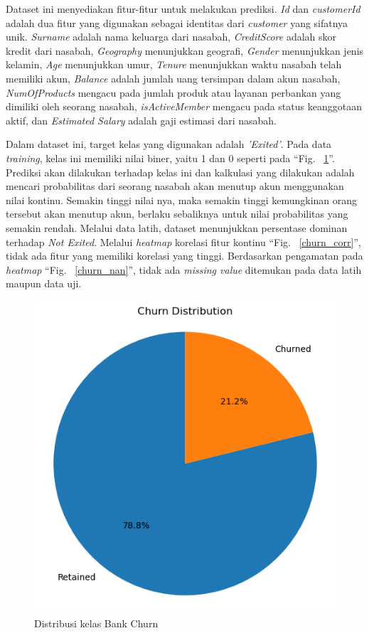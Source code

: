 \documentclass[conference]{IEEEtran}
\begin{document}
Dataset ini menyediakan fitur-fitur untuk melakukan prediksi. \textit{Id} dan \textit{customerId} adalah dua fitur yang digunakan sebagai identitas dari \textit{customer} yang sifatnya unik. \textit{Surname} adalah nama keluarga dari nasabah, 
\textit{CreditScore} adalah skor kredit dari nasabah, \textit{Geography} menunjukkan geografi, \textit{Gender} menunjukkan jenis kelamin, \textit{Age} menunjukkan umur, \textit{Tenure} menunjukkan waktu nasabah telah memiliki akun, \textit{Balance} adalah jumlah 
uang tersimpan dalam akun nasabah, \textit{NumOfProducts} mengacu pada jumlah produk atau layanan perbankan yang dimiliki oleh seorang nasabah, \textit{isActiveMember} mengacu pada status keanggotaan aktif, dan \textit{Estimated Salary} 
adalah gaji estimasi dari nasabah.

Dalam dataset ini, target kelas yang digunakan adalah \textit{'Exited'}. Pada data \textit{training}, kelas ini memiliki nilai biner, yaitu 1 dan 0 seperti pada ``Fig. ~\ref{churn_distribution}''. Prediksi akan dilakukan terhadap kelas ini dan kalkulasi yang dilakukan adalah 
mencari probabilitas dari seorang nasabah akan menutup akun menggunakan nilai kontinu. Semakin tinggi nilai nya, maka semakin tinggi kemungkinan orang tersebut akan menutup akun, berlaku sebaliknya untuk nilai 
probabilitas yang semakin rendah. Melalui data latih, dataset menunjukkan persentase dominan terhadap \textit{Not Exited}. Melalui \textit{heatmap} korelasi fitur kontinu ``Fig. ~\ref{churn_corr}'', tidak ada fitur yang memiliki korelasi yang tinggi. 
Berdasarkan pengamatan pada \textit{heatmap} ``Fig. ~\ref{churn_nan}'', tidak ada \textit{missing value} ditemukan pada data latih maupun data uji.

\begin{figure}[htbp]
    \centerline{\includegraphics[width=\linewidth, scale=0.7]{churn_distribution.png}}
    \caption{Distribusi kelas Bank Churn}
    \label{churn_distribution}
\end{figure}
\end{document}
